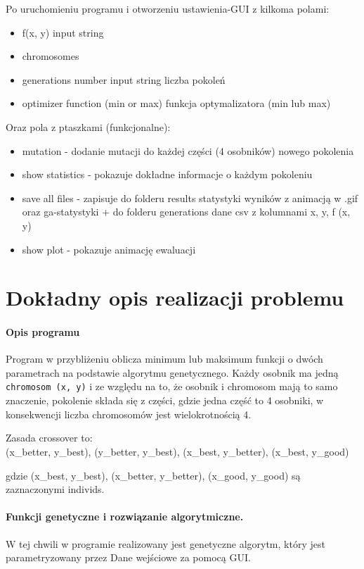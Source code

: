 \documentclass[a4paper, 12pt]{article}
\begin{document}
Po uruchomieniu programu i otworzeniu ustawienia-GUI z kilkoma polami:
\begin{itemize}
    \item f(x, y) input string
    \item chromosomes
    \item generations number input string liczba pokoleń
    \item optimizer function (min or max) funkcja optymalizatora (min lub max)
\end{itemize}
Oraz pola z ptaszkami (funkcjonalne):
\begin{itemize}
    \item mutation - dodanie mutacji do każdej części (4 osobników) nowego pokolenia
    \item show statistics - pokazuje dokładne informacje o każdym pokoleniu
    \item save all files - zapisuje do folderu results statystyki wyników z animacją w .gif oraz ga-statystyki + do folderu generations dane csv z kolumnami x, y, f (x, y)
    \item show plot - pokazuje animację ewaluacji
    
\end{itemize}


\section{Dokładny opis realizacji problemu}
\paragraph{Opis programu} \hfill \break
Program w przybliżeniu oblicza minimum lub maksimum funkcji o dwóch parametrach na podstawie algorytmu genetycznego.
Każdy osobnik ma jedną  \texttt{chromosom (x, y)} i ze względu na to, że osobnik i chromosom mają to samo znaczenie, pokolenie składa się z części, gdzie jedna część to 4 osobniki, w konsekwencji liczba chromosomów jest wielokrotnością 4.

Zasada crossover to:\\
(x\_better, y\_best), (y\_better, y\_best), (x\_best, y\_better), (x\_best, y\_good)

gdzie (x\_best, y\_best), (x\_better, y\_better), (x\_good, y\_good) są zaznaczonymi individs.

\paragraph{Funkcji genetyczne i rozwiązanie algorytmiczne.} \hfill \break
W tej chwili w programie realizowany jest genetyczne algorytm, który jest parametryzowany przez Dane wejściowe za pomocą GUI.
\end{document}
